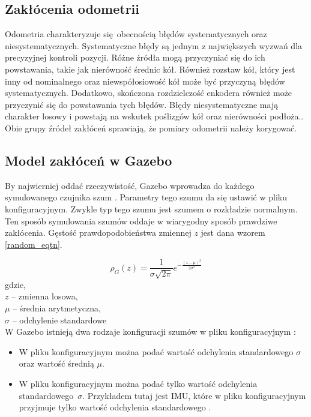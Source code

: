 {    \subsection{Zakłócenia odometrii}
    {
        Odometria charakteryzuje się obecnością błędów systematycznych oraz niesystematycznych. Systematyczne błędy są jednym z największych wyzwań dla precyzyjnej kontroli pozycji. Różne źródła mogą przyczyniać się do ich powstawania, takie jak nierówność średnic kół. Również rozstaw kół, który jest inny od nominalnego oraz niewspółosiowość kół może być przyczyną błędów systematycznych. Dodatkowo, skończona rozdzielczość enkodera również może przyczynić się do powstawania tych błędów. 
        Błędy niesystematyczne mają charakter losowy i powstają na wskutek poślizgów kół oraz nierówności podłoża..
        Obie grupy źródeł zakłóceń sprawiają, że pomiary odometrii należy korygować. 
    }
    \subsection{Model zakłóceń w Gazebo}
    {
        By najwierniej oddać rzeczywistość, Gazebo wprowadza do każdego symulowanego czujnika szum \cite{gazebo_noise}. Parametry tego szumu da się ustawić w pliku konfiguracyjnym. Zwykle typ tego szumu jest szumem o rozkładzie normalnym. Ten sposób symulowania szumów oddaje w wiarygodny sposób prawdziwe zakłócenia. 
        Gęstość prawdopodobieństwa zmiennej $z$ jest dana wzorem \ref{random_eqtn}.

        \begin{equation}\label{random_eqtn}
            \rho_G(z) = \frac{1}{\sigma\sqrt{2\pi}} {e}^{-\frac{(z-\mu)^2}{2{\sigma}^2}}
        \end{equation}
        gdzie,\\
        $z$ -- zmienna losowa,\\
        $\mu$ -- średnia arytmetyczna,\\
        $\sigma$ -- odchylenie standardowe\\

        \newpage
        W Gazebo istnieją dwa rodzaje konfiguracji szumów w pliku konfiguracyjnym \cite{skid_steer_drive_controller}:
        \begin{itemize}
            \item W pliku konfiguracyjnym można podać wartość odchylenia standardowego $\sigma$ oraz wartość średnią $\mu$.
            \item W pliku konfiguracyjnym można podać tylko wartość odchylenia standardowego~$\sigma$. Przykładem tutaj jest IMU, które w pliku konfiguracyjnym przyjmuje tylko wartość odchylenia standardowego \cite{imu_std_dev}.
        \end{itemize}
        
}}
